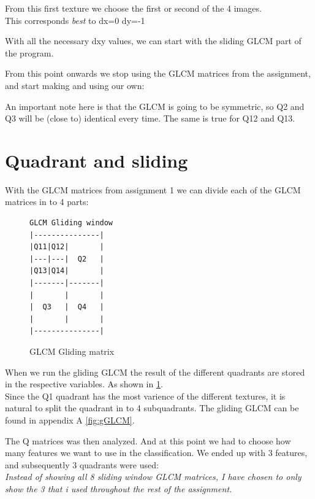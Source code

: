 \documentclass{article}
\begin{document}
	From this first texture we choose the first or second of the 4 images.\\
	This corresponds \textit{best} to dx=0 dy=-1

\vspace{10px}		
	
	With all the necessary dxy values, we can start with the sliding GLCM part of the program.

\newpage
From this point onwards we stop using the GLCM matrices from the assignment, and start making and using our own:

An important note here is that the GLCM is going to be symmetric, so Q2 and Q3 will be (close to) identical every time. The same is true for Q12 and Q13.


\newpage
\section{Quadrant and sliding}
	With the GLCM matrices from assignment 1 we can divide each of the GLCM matrices in to 4 parts: 

	\begin{figure}[h]
	\centering
	\begin{BVerbatim}
GLCM Gliding window
|---------------|
|Q11|Q12|       |
|---|---|  Q2   |
|Q13|Q14|       |
|-------|-------|
|       |       |
|  Q3   |  Q4   |
|       |       |
|---------------|
	\end{BVerbatim}
	\caption{GLCM Gliding matrix}%
	\label{verb:gGLCM}
	\end{figure}


When we run the gliding GLCM the result of the different quadrants are stored in the respective variables. As shown in \ref{verb:gGLCM}.\\

Since the Q1 quadrant has the most varience of the different textures, it
is natural to split the quadrant in to 4 subquadrants.
The gliding GLCM can be found in appendix A \ref{fig:gGLCM}.



\newpage
The Q matrices was then analyzed. And at this point we had to choose how many features we want to use in the classification. We ended up with 3 features, and subsequently 3 quadrants were used:\\
\textit{Instead of showing all 8 sliding window GLCM matrices, I have chosen to only show the 3 that i used throughout the rest of the assignment.}\\
\end{document}
